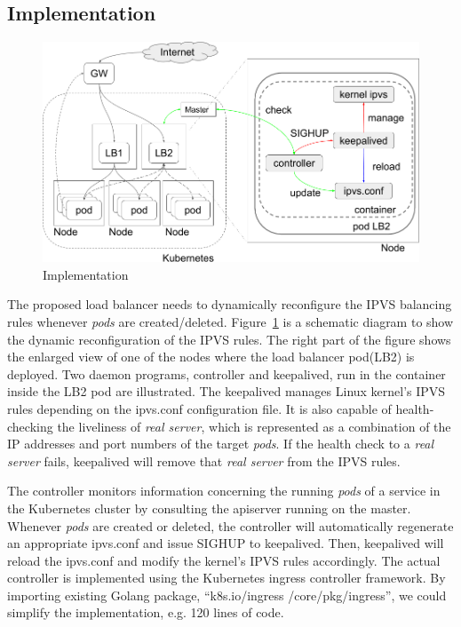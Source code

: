 \subsection{Implementation}\label{Implementation}

\begin{figure}
\includegraphics[width=\columnwidth]{Figs/IPVS-ingress-schem}
\caption{Implementation}
\label{fig:IPVS-ingress-schem}
\end{figure}

The proposed load balancer needs to dynamically reconfigure the IPVS balancing rules whenever {\em pods} are created/deleted. 
Figure~\ref{fig:IPVS-ingress-schem} is a schematic diagram to show the dynamic reconfiguration of the IPVS rules.
The right part of the figure shows the enlarged view of one of the nodes where the load balancer pod(LB2) is deployed.
Two daemon programs, controller and keepalived, run in the container inside the LB2 pod are illustrated.
The keepalived manages Linux kernel's IPVS rules depending on the ipvs.conf configuration file.
It is also capable of health-checking the liveliness of {\em real server}, 
which is represented as a combination of the IP addresses and port numbers of the target {\em pods}. 
If the health check to a {\em real server} fails, keepalived will remove that {\em real server} from the IPVS rules.

The controller monitors information concerning the running {\em pods} of a service 
in the Kubernetes cluster by consulting the apiserver running on the master.
Whenever {\em pods} are created or deleted, the controller will automatically regenerate an appropriate ipvs.conf 
and issue SIGHUP to keepalived.
Then, keepalived will reload the ipvs.conf and modify the kernel's IPVS rules accordingly.
The actual controller\cite{ktaka_ccmp_2017_826894} is implemented using the Kubernetes ingress controller\cite{K8sIngress2017} framework. 
By importing existing Golang package, \enquote{k8s.io/ingress /core/pkg/ingress}, we could simplify the implementation, e.g. 
120 lines of code.  

